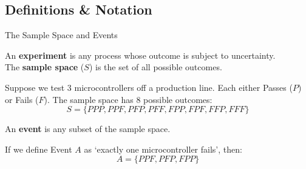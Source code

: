 \subsection{Definitions \& Notation}

\begin{frame}[allowframebreaks]{The Sample Space and Events}
    \begin{definition}
        An \textbf{experiment} is any process whose outcome is subject to uncertainty. \\
        The \textbf{sample space} ($S$) is the set of all possible outcomes.
    \end{definition}


    \begin{example}
        Suppose we test 3 microcontrollers off a production line. Each either Passes ($P$) or Fails ($F$). 
        The sample space has 8 possible outcomes:
        \[ S = \{PPP, PPF, PFP, PFF, FPP, FPF, FFP, FFF\} \]
    \end{example}

    \begin{definition}[Event]
        An \textbf{event} is any subset of the sample space. 
    \end{definition}
    
    
    If we define Event $A$ as \lq exactly one microcontroller fails\rq, then:
    \[ A = \{PPF, PFP, FPP\} \]
\end{frame}

